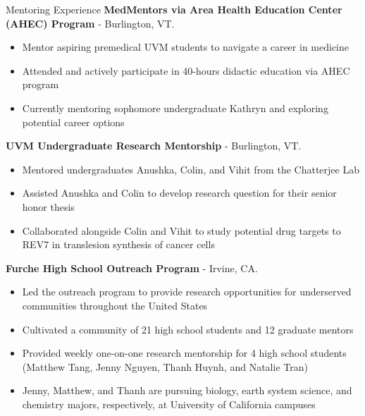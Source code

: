 \begin{rubric}{Mentoring Experience}
%
   \textbf{MedMentors via Area Health Education Center (AHEC) Program}
  - Burlington, VT.
  \vspace{-0.5em}
  \begin{itemize}
    \itemsep-0.5em
  \item Mentor aspiring premedical UVM students to navigate a career in medicine
  \item Attended and actively participate in 40-hours didactic education via AHEC program
  \item Currently mentoring sophomore undergraduate Kathryn and exploring potential career
    options
  \end{itemize}
%
   \textbf{UVM Undergraduate Research Mentorship} - Burlington, VT.
  \vspace{-0.5em}
  \begin{itemize}
    \itemsep-0.5em
  \item Mentored undergraduates Anushka, Colin, and Vihit from the Chatterjee Lab
  \item Assisted Anushka and Colin to develop research question for their senior
    honor thesis
  \item Collaborated alongside Colin and Vihit to study potential drug targets to REV7 in
    translesion synthesis of cancer cells
  \end{itemize}
%
   \textbf{Furche High School Outreach Program} - Irvine, CA.
  \vspace{-0.5em}
   \begin{itemize}
     \itemsep-0.5em
   \item Led the outreach program to provide research opportunities for underserved communities
     throughout the United States
   \item Cultivated a community of 21 high school students and
     12 graduate mentors
   \item Provided weekly one-on-one research mentorship for 4 high school students
     (Matthew Tang, Jenny Nguyen, Thanh Huynh, and Natalie Tran)
   \item Jenny, Matthew, and Thanh are pursuing biology, earth system science, and chemistry
     majors, respectively, at University of California campuses
     \vspace{-1em}

\end{itemize}
\end{rubric}
